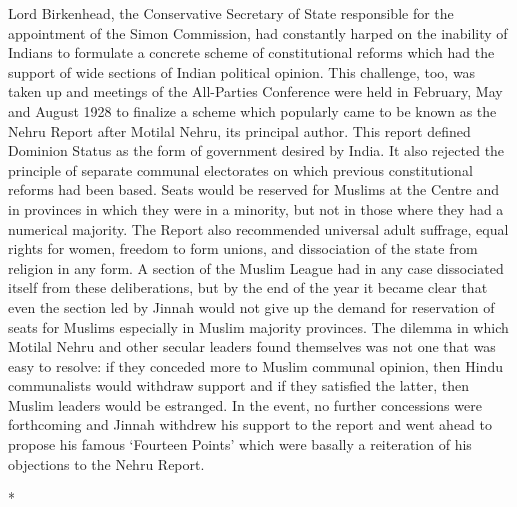 Lord Birkenhead, the Conservative Secretary of State responsible for the appointment of the Simon Commission, had constantly harped on the inability of Indians to formulate a concrete scheme of constitutional reforms which had the support of wide sections of Indian political opinion. This challenge, too, was taken up and meetings of the All-Parties Conference were held in February, May and August 1928 to finalize a scheme which popularly came to be known as the Nehru Report after Motilal Nehru, its principal author. This report defined Dominion Status as the form of government desired by India. It also rejected the principle of separate communal electorates on which previous constitutional reforms had been based. Seats would be reserved for Muslims at the Centre and in provinces in which they were in a minority, but not in those where they had a numerical majority. The Report also recommended universal adult suffrage, equal rights for women, freedom to form unions, and dissociation of the state from religion in any form. A section of the Muslim League had in any case dissociated itself from these deliberations, but by the end of the year it became clear that even the section led by Jinnah would not give up the demand for reservation of seats for Muslims especially in Muslim majority provinces. The dilemma in which Motilal Nehru and other secular leaders found themselves was not one that was easy to resolve: if they conceded more to Muslim communal opinion, then Hindu communalists would withdraw support and if they satisfied the latter, then Muslim leaders would be estranged. In the event, no further concessions were forthcoming and Jinnah withdrew his support to the report and went ahead to propose his famous `Fourteen Points' which were basally a reiteration of his objections to the Nehru Report.

\begin{center}*\end{center}

\paragraph*{}


